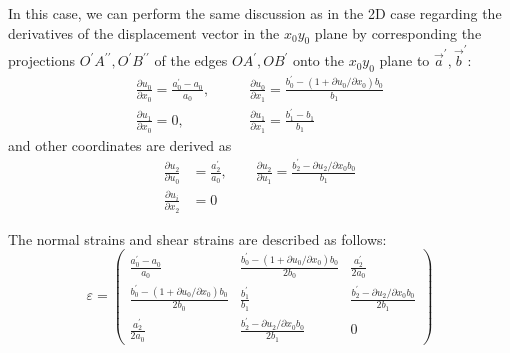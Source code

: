 \documentclass[]{article}
\theoremstyle{definition}
\newcommand{\parderiv}[2]{\frac{\partial #1}{\partial #2}}
\begin{document}
In this case, we can perform the same discussion as in the 2D case regarding the derivatives of the displacement vector in the $x_0y_0$ plane 
by corresponding the projections $O^\prime A^{\prime\prime}, O^\prime B^{\prime\prime}$ of the edges $OA^\prime, OB^\prime$ onto the $x_0y_0$ plane to $\vec{a}^\prime, \vec{b}^\prime$:
\begin{equation}
    \begin{aligned}
        \parderiv{u_0}{x_0} = \frac{a^\prime_0-a_0}{a_0},&\qquad\parderiv{u_0}{x_1} = \frac{b^\prime_0-(1 + \partial u_0/\partial x_0) b_0}{b_1}\\
        \parderiv{u_1}{x_0} = 0,&\qquad\parderiv{u_1}{x_1} = \frac{b^\prime_1 - b_1}{b_1}
    \end{aligned}
\end{equation}
and other coordinates are derived as
\begin{equation}
    \begin{aligned}
        \parderiv{u_2}{u_0} &= \frac{a_2^\prime}{a_0}, \qquad \parderiv{u_2}{u_1} = \frac{b_2^\prime - \partial u_2/\partial x_0 b_0}{b_1}\\
        \parderiv{u_i}{x_2} &= 0            
    \end{aligned}
\end{equation}

The normal strains and shear strains are described as follows:
\begin{equation}
    \mathbb{\varepsilon} = 
    \begin{pmatrix}
        \frac{a_0^\prime-a_0}{a_0} & \frac{b_0^\prime-(1+\partial u_0/\partial x_0)b_0}{2b_0} & \frac{a_2^\prime}{2a_0} \\
        \frac{b_0^\prime-(1+\partial u_0/\partial x_0)b_0}{2b_0} & \frac{b_1^\prime}{b_1} & \frac{b_2^\prime - \partial u_2/\partial x_0 b_0}{2b_1}\\
        \frac{a_2^\prime}{2a_0} &  \frac{b_2^\prime - \partial u_2/\partial x_0 b_0}{2b_1} & 0
    \end{pmatrix}
\end{equation}
\end{document}
